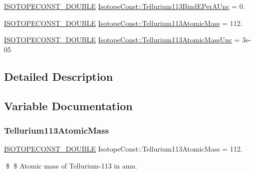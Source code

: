 \begin{DoxyCompactItemize}
\mbox{\hyperlink{group___isotope_const-_macros_ga8f45a7272ce02c0b4c65c44636ed719a}{I\+S\+O\+T\+O\+P\+E\+C\+O\+N\+S\+T\+\_\+\+D\+O\+U\+B\+LE}} \mbox{\hyperlink{group___isotope_const-_tellurium-_te113_ga32b2816bb7e4caea1229aacd550e9e70}{Isotope\+Const\+::\+Tellurium113\+Bind\+E\+Per\+A\+Unc}} = 0.
\item 
\mbox{\hyperlink{group___isotope_const-_macros_ga8f45a7272ce02c0b4c65c44636ed719a}{I\+S\+O\+T\+O\+P\+E\+C\+O\+N\+S\+T\+\_\+\+D\+O\+U\+B\+LE}} \mbox{\hyperlink{group___isotope_const-_tellurium-_te113_gad35a69de9377d076b0a30c8da8bff61d}{Isotope\+Const\+::\+Tellurium113\+Atomic\+Mass}} = 112.
\item 
\mbox{\hyperlink{group___isotope_const-_macros_ga8f45a7272ce02c0b4c65c44636ed719a}{I\+S\+O\+T\+O\+P\+E\+C\+O\+N\+S\+T\+\_\+\+D\+O\+U\+B\+LE}} \mbox{\hyperlink{group___isotope_const-_tellurium-_te113_ga73e081afb07898923c9bb0d19256933a}{Isotope\+Const\+::\+Tellurium113\+Atomic\+Mass\+Unc}} = 3e-\/05
\end{DoxyCompactItemize}


\subsection{Detailed Description}


\subsection{Variable Documentation}
\mbox{\label{group___isotope_const-_tellurium-_te113_gad35a69de9377d076b0a30c8da8bff61d}} 
\subsubsection{\texorpdfstring{Tellurium113\+Atomic\+Mass}{Tellurium113AtomicMass}}
{\footnotesize\ttfamily \mbox{\hyperlink{group___isotope_const-_macros_ga8f45a7272ce02c0b4c65c44636ed719a}{I\+S\+O\+T\+O\+P\+E\+C\+O\+N\+S\+T\+\_\+\+D\+O\+U\+B\+LE}} Isotope\+Const\+::\+Tellurium113\+Atomic\+Mass = 112.}

\$ \$ Atomic mass of Tellurium-\/113 in amu. \mbox{\label{group___isotope_const-_tellurium-_te113_ga73e081afb07898923c9bb0d19256933a}} 
